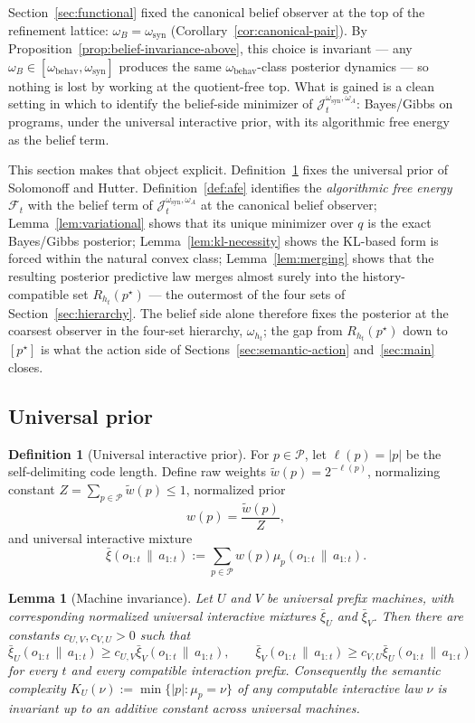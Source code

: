 \documentclass[11pt]{article}
\newtheorem{lemma}[theorem]{Lemma}
\theoremstyle{definition}
\newtheorem{definition}[theorem]{Definition}
\theoremstyle{remark}
\newcommand{\Pcal}{\mathcal{P}}
\newcommand{\Fcal}{\mathcal{F}}
\newcommand{\givena}{\,\|\,}
\newcommand{\ellp}{\ell}
\newcommand{\wt}{\widetilde}
\newcommand{\barxi}{\bar{\xi}}
\begin{document}
Section~\ref{sec:functional} fixed the canonical belief observer at the top of the refinement lattice: $\omega_B=\omega_{\mathrm{syn}}$ (Corollary~\ref{cor:canonical-pair}). By Proposition~\ref{prop:belief-invariance-above}, this choice is invariant --- any $\omega_B\in[\omega_{\mathrm{behav}},\omega_{\mathrm{syn}}]$ produces the same $\omega_{\mathrm{behav}}$-class posterior dynamics --- so nothing is lost by working at the quotient-free top. What is gained is a clean setting in which to identify the belief-side minimizer of $\mathcal J_t^{\omega_{\mathrm{syn}},\omega_A}$: Bayes/Gibbs on programs, under the universal interactive prior, with its algorithmic free energy as the belief term.

This section makes that object explicit. Definition~\ref{def:universal-prior} fixes the universal prior of Solomonoff and Hutter. Definition~\ref{def:afe} identifies the \emph{algorithmic free energy} $\Fcal_t$ with the belief term of $\mathcal J_t^{\omega_{\mathrm{syn}},\omega_A}$ at the canonical belief observer; Lemma~\ref{lem:variational} shows that its unique minimizer over $q$ is the exact Bayes/Gibbs posterior; Lemma~\ref{lem:kl-necessity} shows the KL-based form is forced within the natural convex class; Lemma~\ref{lem:merging} shows that the resulting posterior predictive law merges almost surely into the history-compatible set $R_{h_t}(p^\star)$ --- the outermost of the four sets of Section~\ref{sec:hierarchy}. The belief side alone therefore fixes the posterior at the coarsest observer in the four-set hierarchy, $\omega_{h_t}$; the gap from $R_{h_t}(p^\star)$ down to $[p^\star]$ is what the action side of Sections~\ref{sec:semantic-action} and~\ref{sec:main} closes.

\subsection{Universal prior}

\begin{definition}[Universal interactive prior]
\label{def:universal-prior}
For $p\in\Pcal$, let $\ellp(p)=|p|$ be the self-delimiting code length. Define raw weights $\wt w(p)=2^{-\ellp(p)}$, normalizing constant $Z=\sum_{p\in\Pcal}\wt w(p)\le 1$, normalized prior
\[
w(p)=\frac{\wt w(p)}{Z},
\]
and universal interactive mixture
\[
\barxi(o_{1:t}\givena a_{1:t})
:=
\sum_{p\in\Pcal} w(p)\mu_p(o_{1:t}\givena a_{1:t}).
\]
\end{definition}

\begin{lemma}[Machine invariance]
\label{lem:prior-invariance}
Let $U$ and $V$ be universal prefix machines, with corresponding normalized universal interactive mixtures $\barxi_U$ and $\barxi_V$. Then there are constants $c_{U,V}, c_{V,U}>0$ such that
\[
\barxi_U(o_{1:t}\givena a_{1:t})\ge c_{U,V}\barxi_V(o_{1:t}\givena a_{1:t}),
\qquad
\barxi_V(o_{1:t}\givena a_{1:t})\ge c_{V,U}\barxi_U(o_{1:t}\givena a_{1:t})
\]
for every $t$ and every compatible interaction prefix. Consequently the semantic complexity $K_U(\nu):=\min\{|p|:\mu_p=\nu\}$ of any computable interactive law $\nu$ is invariant up to an additive constant across universal machines.
\end{lemma}
\end{document}
